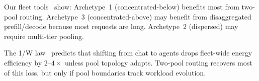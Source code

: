 \begin{observation}
\label{obs:wp-topo}
Our fleet tools~\cite{fleetopt2026, fleetsim2026} show:
Archetype~1 (concentrated-below) benefits most from two-pool routing.
Archetype~3 (concentrated-above) may benefit from disaggregated
prefill/decode because most requests are long.  Archetype~2
(dispersed) may require multi-tier pooling.
\end{observation}

\begin{observation}
\label{obs:wp-energy}
The 1/W law~\cite{onewlaw2026} predicts that shifting from chat
to agents drops fleet-wide energy efficiency by $2$--$4\times$
unless pool topology adapts.  Two-pool routing recovers most of
this loss, but only if pool boundaries track workload evolution.
\end{observation}


